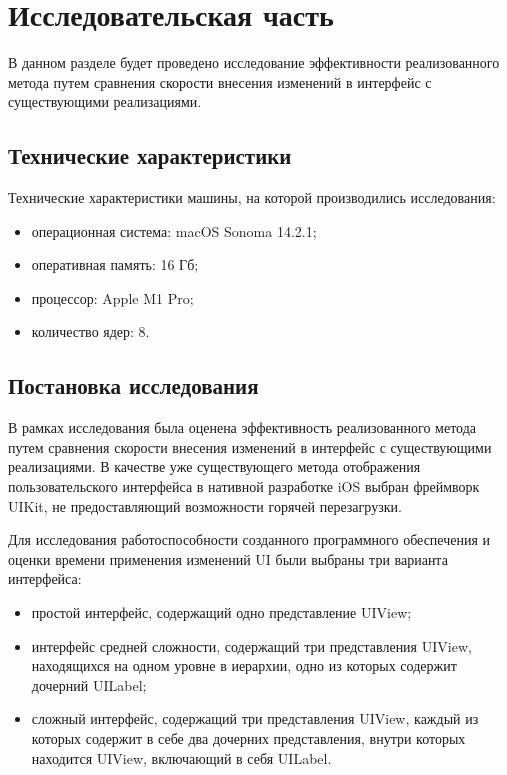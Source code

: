 \section{Исследовательская часть}

В данном разделе будет проведено исследование эффективности реализованного метода путем сравнения скорости внесения изменений в интерфейс с существующими реализациями.

\subsection{Технические характеристики}

Технические характеристики машины, на которой производились исследования:
\begin{itemize}[label=---]
	\item операционная система: macOS Sonoma 14.2.1;
	\item оперативная память: 16 Гб;
	\item процессор: Apple M1 Pro;
	 \item количество ядер: 8.
\end{itemize}

\subsection{Постановка исследования}

В рамках исследования была оценена эффективность реализованного метода путем сравнения скорости внесения изменений в интерфейс с существующими реализациями.
В качестве уже существующего метода отображения пользовательского интерфейса в нативной разработке iOS выбран фреймворк UIKit, не предоставляющий возможности горячей перезагрузки.

Для исследования работоспособности созданного программного обеспечения и оценки времени применения изменений UI были выбраны три варианта интерфейса:
\begin{itemize}[label=---]
	\item простой интерфейс, содержащий одно представление UIView;
	\item интерфейс средней сложности, содержащий три представления UIView, находящихся на одном уровне в иерархии, одно из которых содержит дочерний UILabel;
	\item сложный интерфейс, содержащий три представления UIView, каждый из которых содержит в себе два дочерних представления, внутри которых находится UIView, включающий в себя UILabel.
\end{itemize}	


